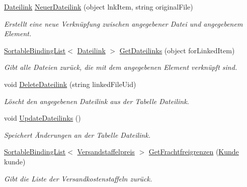 \begin{DoxyCompactItemize}
\hyperlink{class_products_1_1_model_1_1_entities_1_1_dateilink}{Dateilink} \hyperlink{class_products_1_1_model_1_1_model_service_a8f47a2df875f4bdc1a27eb81f54a8723}{Neuer\+Dateilink} (object lnk\+Item, string original\+File)
\begin{DoxyCompactList}\small\item\em Erstellt eine neue Verknüpfung zwischen angegebener Datei und angegebenem Element. \end{DoxyCompactList}\item 
\hyperlink{class_products_1_1_common_1_1_sortable_binding_list}{Sortable\+Binding\+List}$<$ \hyperlink{class_products_1_1_model_1_1_entities_1_1_dateilink}{Dateilink} $>$ \hyperlink{class_products_1_1_model_1_1_model_service_a2a185507d0605a07160182f815dae3b2}{Get\+Dateilinks} (object for\+Linked\+Item)
\begin{DoxyCompactList}\small\item\em Gibt alle Dateien zurück, die mit dem angegebenen Element verknüpft sind. \end{DoxyCompactList}\item 
void \hyperlink{class_products_1_1_model_1_1_model_service_a8aa15e34a246e15ade7dfae12e520873}{Delete\+Dateilink} (string linked\+File\+Uid)
\begin{DoxyCompactList}\small\item\em Löscht den angegebenen Dateilink aus der Tabelle Dateilink. \end{DoxyCompactList}\item 
void \hyperlink{class_products_1_1_model_1_1_model_service_a35cd9352d37ede720108517399d674d3}{Update\+Dateilinks} ()
\begin{DoxyCompactList}\small\item\em Speichert Änderungen an der Tabelle Dateilink. \end{DoxyCompactList}\item 
\hyperlink{class_products_1_1_common_1_1_sortable_binding_list}{Sortable\+Binding\+List}$<$ \hyperlink{class_products_1_1_model_1_1_entities_1_1_versandstaffelpreis}{Versandstaffelpreis} $>$ \hyperlink{class_products_1_1_model_1_1_model_service_abaa2483cab687111e75416e61cd20e59}{Get\+Frachtfreigrenzen} (\hyperlink{class_products_1_1_model_1_1_entities_1_1_kunde}{Kunde} kunde)
\begin{DoxyCompactList}\small\item\em Gibt die Liste der Versandkostenstaffeln zurück. \end{DoxyCompactList}\item 

\end{DoxyCompactItemize}
